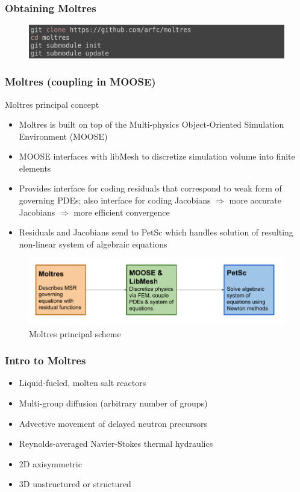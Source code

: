 \begin{frame}
	\frametitle{Obtaining Moltres}
               \begin{figure}[t]
                \includegraphics[height=0.15\textwidth]{./images/clone_moltres.png}
               \end{figure}   
\end{frame}



\begin{frame}
  \frametitle{Moltres (coupling in MOOSE)}
   \begin{block}{Moltres principal concept \cite{lindsay_introduction_2018}}
     \begin{itemize}
        \item Moltres is built on top of the Multi-physics Object-Oriented
Simulation Environment (MOOSE)
		\item MOOSE interfaces with libMesh to discretize simulation volume
into finite elements
		\item Provides interface for coding residuals that correspond to weak
form of governing PDEs; also interface for coding Jacobians $\Rightarrow$
more accurate Jacobians $\Rightarrow$ more efficient convergence
		\item Residuals and Jacobians send to PetSc which handles solution of resulting non-linear system of algebraic equations
     \end{itemize}
    \end{block}
               \begin{figure}[t]
                \includegraphics[height=0.25\textwidth]{./images/moltres-moose-diag.png}
                \caption{Moltres principal scheme}
               \end{figure}   
\end{frame}

\begin{frame}
	\frametitle{Intro to Moltres}
    	\begin{itemize}
			\item Liquid-fueled, molten salt reactors
			\item Multi-group diffusion (arbitrary number of groups)
			\item Advective movement of delayed neutron precursors
			\item Reynolds-averaged Navier-Stokes thermal hydraulics
			\item 2D axisymmetric
			\item 3D unstructured or structured
	    \end{itemize}
\end{frame}


